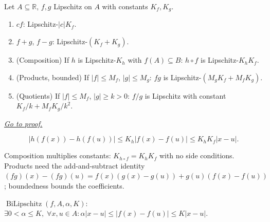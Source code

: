 
\begin{theorem}
\label{thm:algebra-of-lipschitz-functions}
Let $A\subseteq\mathbb{R}$, $f,g$ Lipschitz on $A$ with constants
$K_f,K_g$.
\begin{enumerate}[label=(\alph*)]
  \item $cf$: Lipschitz-$|c|K_f$.
  \item $f+g$, $f-g$: Lipschitz-$(K_f+K_g)$.
  \item (Composition) If $h$ is Lipschitz-$K_h$ with $f(A)\subseteq B$:
    $h\circ f$ is Lipschitz-$K_hK_f$.
  \item (Products, bounded) If $|f|\leq M_f$, $|g|\leq M_g$:
    $fg$ is Lipschitz-$(M_gK_f+M_fK_g)$.
  \item (Quotients) If $|f|\leq M_f$, $|g|\geq k>0$:
    $f/g$ is Lipschitz with constant $K_f/k+M_fK_g/k^2$.
\end{enumerate}

\smallskip\noindent
\hyperref[prf:algebra-of-lipschitz-functions]{\textit{Go to proof.}}
\end{theorem}

\begin{remark*}
\[
  |h(f(x))-h(f(u))|\leq K_h|f(x)-f(u)|\leq K_hK_f|x-u|.
\]
\end{remark*}

\begin{remark*}[Interpretation]
Composition multiplies constants: $K_{h\circ f}=K_hK_f$ with no side
conditions. Products need the add-and-subtract identity
$(fg)(x)-(fg)(u)=f(x)(g(x)-g(u))+g(u)(f(x)-f(u))$;
boundedness bounds the coefficients.
\end{remark*}


\begin{tcolorbox}[title={Definition --- Bi-Lipschitz Map}]
\begin{definition}
\label{def:bi-lipschitz}
$\operatorname{BiLipschitz}(f,A,\alpha,K)$:
$\exists 0<\alpha\leq K,\;\forall x,u\in A:
\alpha|x-u|\leq|f(x)-f(u)|\leq K|x-u|$.
\end{definition}
\end{tcolorbox}

